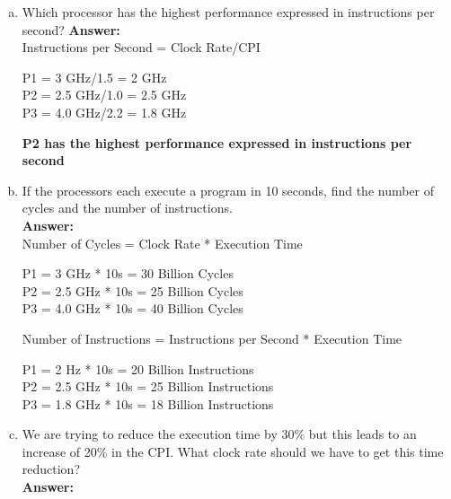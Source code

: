 \documentclass[12pt]{article}
\begin{document}
\begin{enumerate}[(a)]
    \item Which processor has the highest performance expressed in instructions per second?
    \textbf{Answer:}
    \\
    Instructions per Second = Clock Rate/CPI
        \begin{center}
            P1 = 3 GHz/1.5 = 2 GHz\\
            P2 = 2.5 GHz/1.0 = 2.5 GHz\\
            P3 = 4.0 GHz/2.2 = 1.8 GHz\\
        \end{center}
    \textbf{P2 has the highest performance expressed in instructions per second}
    
    \item If the processors each execute a program in 10 seconds, find the number of cycles and the number of instructions.
    \\
    \textbf{Answer:}
    \\
    Number of Cycles = Clock Rate * Execution Time
        \begin{center}
            P1 = 3 GHz * 10s = 30 Billion Cycles\\
            P2 = 2.5 GHz * 10s = 25 Billion Cycles\\
            P3 = 4.0 GHz * 10s = 40 Billion Cycles\\
        \end{center}
    
    Number of Instructions = Instructions per Second * Execution Time
        \begin{center}
            P1 = 2 Hz * 10s = 20 Billion Instructions\\
            P2 = 2.5 GHz * 10s = 25 Billion Instructions\\
            P3 = 1.8 GHz * 10s = 18 Billion Instructions\\
        \end{center}

    \item We are trying to reduce the execution time by 30\% but this leads to an increase of 20\% in the CPI. What clock rate should we have to get this time reduction?
    \\
    \textbf{Answer:}
    \\
    
    

\end{enumerate}
\end{document}
